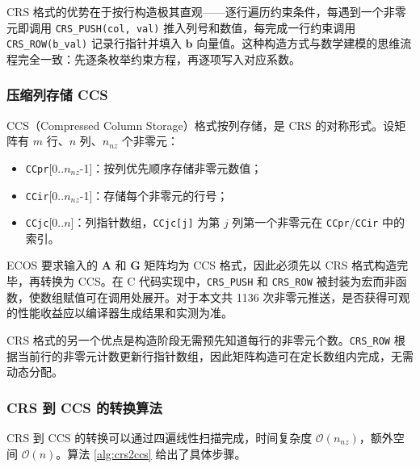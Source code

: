 CRS 格式的优势在于按行构造极其直观——逐行遍历约束条件，每遇到一个非零元即调用 \lstinline{CRS_PUSH(col, val)} 推入列号和数值，每完成一行约束调用 \lstinline{CRS_ROW(b_val)} 记录行指针并填入 $\bm{b}$ 向量值。这种构造方式与数学建模的思维流程完全一致：先逐条枚举约束方程，再逐项写入对应系数。

\subsubsection{压缩列存储 CCS}

CCS（Compressed Column Storage）格式按列存储，是 CRS 的对称形式。设矩阵有 $m$ 行、$n$ 列、$n_{nz}$ 个非零元：

\begin{itemize}
    \item \lstinline{CCpr}[0..$n_{nz}$-1]：按列优先顺序存储非零元数值；
    \item \lstinline{CCir}[0..$n_{nz}$-1]：存储每个非零元的行号；
    \item \lstinline{CCjc}[0..$n$]：列指针数组，\lstinline{CCjc[j]} 为第 $j$ 列第一个非零元在 \lstinline{CCpr}/\lstinline{CCir} 中的索引。
\end{itemize}

ECOS 要求输入的 $\bm{A}$ 和 $\bm{G}$ 矩阵均为 CCS 格式，因此必须先以 CRS 格式构造完毕，再转换为 CCS。在 C 代码实现中，\lstinline{CRS_PUSH} 和 \lstinline{CRS_ROW} 被封装为宏而非函数，使数组赋值可在调用处展开。对于本文共 1136 次非零元推送，是否获得可观的性能收益应以编译器生成结果和实测为准。

CRS 格式的另一个优点是构造阶段无需预先知道每行的非零元个数。\lstinline{CRS_ROW} 根据当前行的非零元计数更新行指针数组，因此矩阵构造可在定长数组内完成，无需动态分配。

\subsubsection{CRS 到 CCS 的转换算法}

CRS 到 CCS 的转换可以通过四遍线性扫描完成，时间复杂度 $\mathcal{O}(n_{nz})$，额外空间 $\mathcal{O}(n)$。算法 \ref{alg:crs2ccs} 给出了具体步骤。

